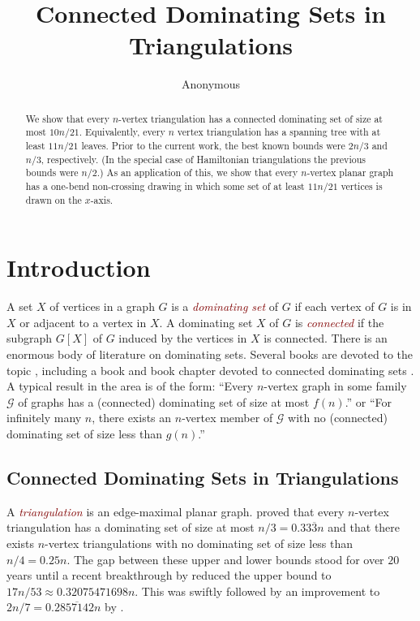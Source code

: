 \documentclass[a4paper,UKenglish,cleveref, autoref, thm-restate]{lipics-v2021}
\title{Connected Dominating Sets in Triangulations}
\author{Anonymous}{Anonymous Affiliation}{anonymous@anonymous.anon}{Anonymous ORCID}{Anonymous Funding Source}
\newcommand{\defin}[1]{\emph{\textcolor{Maroon}{#1}}}
\begin{document}
\maketitle

\begin{abstract}
  We show that every $n$-vertex triangulation has a connected dominating set of size at most $10n/21$.  Equivalently, every $n$ vertex triangulation has a spanning tree with at least $11n/21$ leaves. Prior to the current work, the best known bounds were $2n/3$ and $n/3$, respectively. (In the special case of Hamiltonian triangulations the previous bounds were $n/2$.)  As an application of this, we show that every $n$-vertex planar graph has a one-bend non-crossing drawing in which some set of at least $11n/21$ vertices is drawn on the $x$-axis.
\end{abstract}

\section{Introduction}

A set $X$ of vertices in a graph $G$ is a \defin{dominating set} of $G$ if each vertex of $G$ is in $X$ or adjacent to a vertex in $X$.  A dominating set $X$ of $G$ is \defin{connected} if the subgraph $G[X]$ of $G$ induced by the vertices in $X$ is connected.  There is an enormous body of literature on dominating sets. Several books are devoted to the topic \cite{haynes.hedetniemi.ea:domination,haynes.hedetniemi.ea:topics,du.wan:connected,haynes.hedetniemi.ea:vol2}, including a book and book chapter devoted to connected dominating sets \cite{du.wan:connected,chellali.favaron:connected}.  A typical result in the area is of the form: ``Every $n$-vertex graph in some family $\mathcal{G}$ of graphs has a (connected) dominating set of size at most $f(n)$.'' or ``For infinitely many $n$, there exists an $n$-vertex member of $\mathcal{G}$ with no (connected) dominating set of size less than $g(n)$.''

\subsection{Connected Dominating Sets in Triangulations}

A \defin{triangulation} is an edge-maximal planar graph.  \citet{matheson.tarjan:dominating} proved that every $n$-vertex triangulation has a dominating set of size at most $n/3=0.33\overline{3}n$ and that there exists $n$-vertex triangulations with no dominating set of size less than $n/4=0.25n$. The gap between these upper and lower bounds stood for over $20$ years until a recent breakthrough by \citet{spacapan:domination} reduced the upper bound to $17n/53\approx 0.32075471698n$.  This was swiftly followed by an improvement to $2n/7= 0.2\overline{857142}n$ by \citet{christiansen.rotenberg.ea:triangulations}.
\end{document}
